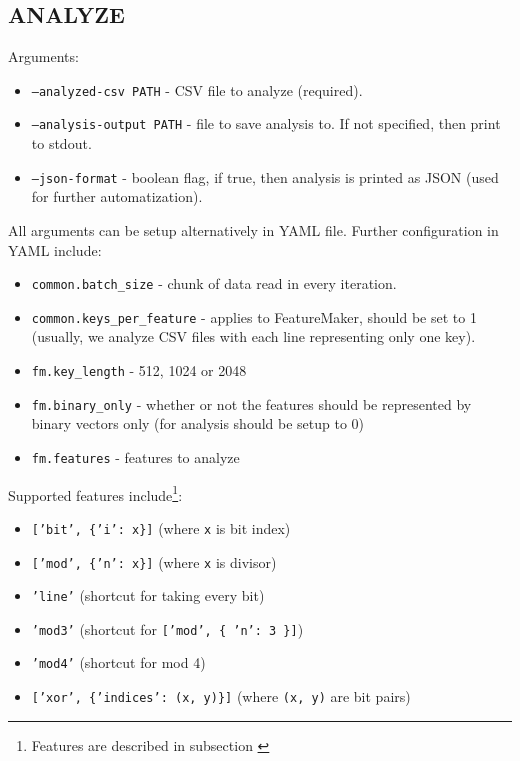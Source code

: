 \subsection*{ANALYZE}

\noindent
Arguments:

\begin{itemize}

\item \texttt{--analyzed-csv PATH} - CSV file to analyze (required).
\item \texttt{--analysis-output PATH} - file to save analysis to. If not specified, then print to stdout.
\item \texttt{--json-format} - boolean flag, if true, then analysis is printed as JSON (used for further automatization).

\end{itemize}

\noindent
All arguments can be setup alternatively in YAML file. Further configuration in YAML include:

\begin{itemize}

\item \texttt{common.batch\_size} - chunk of data read in every iteration.
\item \texttt{common.keys\_per\_feature} - applies to FeatureMaker, should be set to 1 (usually, we analyze CSV files with each line representing only one key).
\item \texttt{fm.key\_length} - 512, 1024 or 2048
\item \texttt{fm.binary\_only} - whether or not the features should be represented by binary vectors only (for analysis should be setup to 0)
\item \texttt{fm.features} - features to analyze

\end{itemize}

\noindent
Supported features include\footnote{Features are described in subsection \label{feature-maker}}:

\begin{itemize}

\item \texttt{['bit', \{'i': x\}]} (where \texttt{x} is bit index)
\item \texttt{['mod', \{'n': x\}]} (where \texttt{x} is divisor)
\item \texttt{'line'} (shortcut for taking every bit) 
\item \texttt{'mod3'} (shortcut for \texttt{['mod', \{ 'n': 3 \}]})
\item \texttt{'mod4'} (shortcut for mod 4)
\item \texttt{['xor', \{'indices': (x, y)\}]} (where \texttt{(x, y)} are bit pairs)

\end{itemize}


